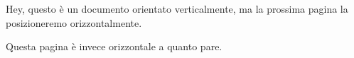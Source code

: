 \documentclass{article}
\begin{document}
Hey, questo è un documento orientato verticalmente, ma la prossima
pagina la posizioneremo orizzontalmente.
\newpage

\begin{landscape}
    Questa pagina è invece orizzontale a quanto pare.
\end{landscape}
\end{document}
